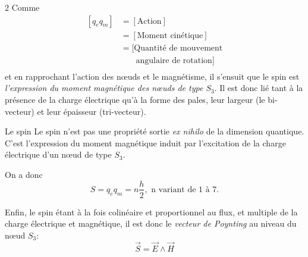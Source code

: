 \begin{multicols}{2}
	Comme
\begin{equation*}
	\begin{split}
		[q_e q_m] &= [ \text{Action} ]                         \\
		          &= [\text{Moment cinétique}]                 \\
		          &= [\text{Quantité de mouvement}             \\
		          &\phantom{= [} \ \text{angulaire de rotation}] \\
	\end{split}
\end{equation*}
et en rapprochant l'action des nœuds et le magnétisme, il s'ensuit que le spin est \textit{l'expression du moment magnétique des nœuds de type $S_3$}. Il est donc lié tant à la présence de la charge électrique qu'à la forme des pales, leur largeur (le bi-vecteur) et leur épaisseur (tri-vecteur).

\clearpage
\begin{mybox}[breakable,colback=blue!10, colbacktitle=pkcolor]{Le spin}
	Le spin n'est pas une propriété sortie \textit{ex nihilo} de la dimension quantique. C'est l'expression du moment magnétique induit par l'excitation de la charge électrique d'un nœud de type $S_3$.
\end{mybox}

On a donc
\begin{equation*}
	S = q_e q_m = n \frac{h}{2}, \text{ n variant de 1 à 7.} 
\end{equation*}

Enfin, le spin étant à la fois colinéaire et proportionnel au flux, et multiple de la charge électrique et magnétique, il est donc le \textit{vecteur de Poynting} au niveau du nœud $S_3$:
\begin{equation*}
	\vec{S} = \vec{E} \wedge \vec{H} 
\end{equation*}





\end{multicols}
